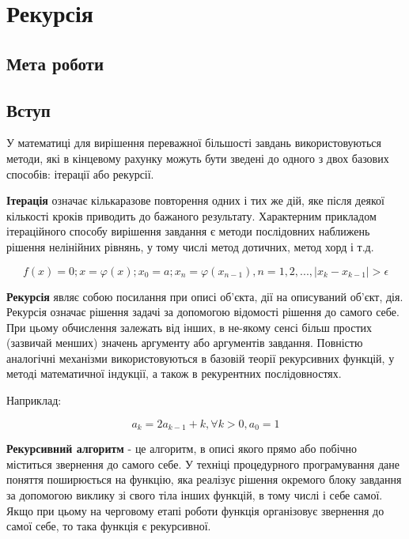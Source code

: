 \chapter{Рекурсія}
\nopagebreak[4]
\section*{Мета роботи}

\nopagebreak[4]
\section{Вступ}
\nopagebreak[4]
У математиці для вирішення переважної більшості завдань використовуються методи, які в кінцевому рахунку можуть бути зведені до одного з двох базових способів: ітерації або рекурсії.


\textbf{Ітерація} означає кількаразове повторення одних і тих же дій, яке після деякої кількості кроків приводить до бажаного результату. Характерним прикладом ітераційного способу вирішення завдання є методи послідовних наближень рішення нелінійних рівнянь, у тому числі метод дотичних, метод хорд і т.д.

\begin{equation}
f(x)=0; x=\varphi(x); x_0=a; x_n=\varphi(x_{n-1}), n=1,2,..., |x_k-x_{k-1}|>\epsilon
\end{equation}

\textbf{Рекурсія} являє собою посилання при описі об'єкта, дії на описуваний об'єкт, дія. Рекурсія означає рішення задачі за допомогою відомості рішення до самого себе. При цьому обчислення залежать від інших, в не-якому сенсі більш простих (зазвичай менших) значень аргументу або аргументів завдання. Повністю аналогічні механізми використовуються в базовій теорії рекурсивних функцій, у методі математичної індукції, а також в рекурентних послідовностях. 

Наприклад:

\begin{equation}
a_k = 2a_{k-1} + k , \forall k > 0, a_0 = 1
\end{equation}

\textbf{Рекурсивний алгоритм} - це алгоритм, в описі якого прямо або побічно міститься звернення до самого себе. У техніці процедурного програмування дане поняття поширюється на функцію, яка реалізує рішення окремого блоку завдання за допомогою виклику зі свого тіла інших функцій, в тому числі і себе самої. Якщо при цьому на черговому етапі роботи функція організовує звернення до самої себе, то така функція є рекурсивної.



